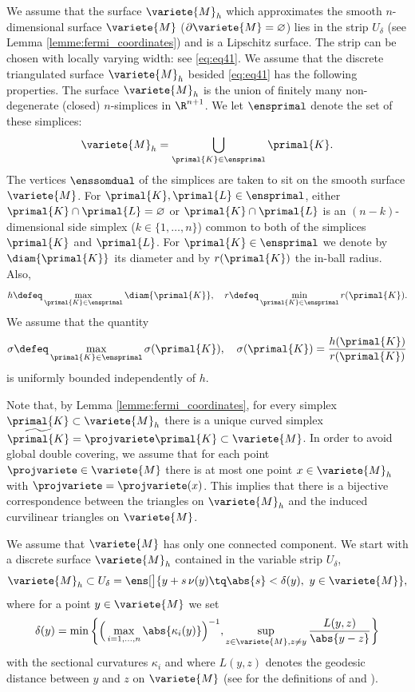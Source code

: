 \begin{envide}
\cite[Sec. 4.1]{dziuk_finite_2013} We assume that the surface $\variete{M}_h$ which approximates the smooth $n$-dimensional surface $\variete{M}$ ($\partial \variete{M} = \varnothing$) lies in the strip $U_\delta$ (see Lemma \ref{lemme:fermi_coordinates}) and is a Lipschitz surface. The strip can be chosen with locally varying width: see \ref{eq:eq41}. We assume that the discrete triangulated surface $\variete{M}_h$ besided \ref{eq:eq41} has the following properties. The surface $\variete{M}_h$ is the union of finitely many non-degenerate (closed) $n$-simplices in $\R^{n+1}$. We let $\ensprimal$ denote the set of these simplices:
\[
\variete{M}_h = \bigcup_{\primal{K} \in \ensprimal} \primal{K}. 
\]
The vertices $\enssomdual$ of the simplices are taken to sit on the smooth surface $\variete{M}$. For $\primal{K}, \primal{L} \in \ensprimal$, either $\primal{K} \cap \primal{L} = \varnothing$ or $\primal{K} \cap \primal{L}$ is an $(n-k)$-dimensional side simplex ($k \in \{1, \dots, n\}$) common to both of the simplices $\primal{K}$ and $\primal{L}$. For $\primal{K} \in \ensprimal$ we denote by $\diam{\primal{K}}$ its diameter and by $r(\primal{K})$ the in-ball radius. Also,
\[
h \defeq \max_{\primal{K} \in \ensprimal} \diam{\primal{K}}, \quad r \defeq \min_{\primal{K} \in \ensprimal} r(\primal{K}).
\]
We assume that the quantity
\[
\sigma \defeq \max_{\primal{K} \in \ensprimal} \sigma(\primal{K}), \quad \sigma(\primal{K}) = \frac{h(\primal{K})}{r(\primal{K})}
\]
is uniformly bounded independently of $h$.
\end{envide}

Note that, by Lemma \ref{lemme:fermi_coordinates}, for every simplex $\primal{K} \subset \variete{M}_h$ there is a unique curved simplex $\widetilde{\primal{K}} = \projvariete \primal{K} \subset \variete{M}$. In order to avoid global double covering, we assume that for each point $\projvariete \in \variete{M}$ there is at most one point $x \in \variete{M}_h$ with $\projvariete = \projvariete(x)$. This implies that there is a bijective correspondence between the triangles on $\variete{M}_h$ and the induced curvilinear triangles on $\variete{M}$.

We assume that $\variete{M}$ has only one connected component. We start with a discrete surface $\variete{M}_h$ contained in the variable strip $U_\delta$,
\begin{equation} \label{eq:eq41}
    \variete{M}_h \subset U_\delta = \ens[\big]{y + s \, \nu(y) \tq \abs{s} < \delta(y),\ y \in \variete{M}},
\end{equation}
where for a point $y \in \variete{M}$ we set
\[
\delta(y) = \min \bigg\{ \Big( \max_{i = 1, \dots, n} \abs{\kappa_i(y)} \Big)^{-1}, \sup_{z \in \variete{M}, z \not= y} \frac{L(y, z)}{\abs{y - z}} \bigg\}
\]
with the sectional curvatures $\kappa_i$ and where $L(y, z)$ denotes the geodesic distance between $y$ and $z$ on $\variete{M}$ (see \cite{lee_riemannian_1997} for the definitions of  and ). 

